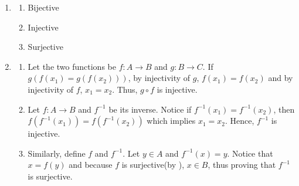 \begin{Solution}
    \begin{enumerate}
      \item{
          \begin{enumerate}
            \item{Bijective}
            \item{Injective}
            \item{Surjective}
          \end{enumerate}
        } 
      \item{
          \begin{enumerate}
            \item{Let the two functions be \(f: A \to B\) and \(g: B \to C\). If \(g(f(x_1)=g(f(x_2)))\), by injectivity of \(g\), \(f(x_1)=f(x_2)\) and by injectivity of \(f\), \(x_1=x_2\). Thus, \(g \circ f\) is injective.}
            \item{Let \(f:A \to B\) and \(f^{-1}\) be its inverse. Notice if \(f^{-1}(x_1)=f^{-1}(x_2)\), then \(f(f^{-1}(x_1))=f(f^{-1}(x_2))\) which implies \(x_1=x_2\). Hence, \(f^{-1}\) is injective.}
            \item{Similarly, define \(f\) and \(f^{-1}\). Let \(y \in A\) and \(f^{-1}(x)=y\). Notice that \(x=f(y)\) and because \(f\) is surjective(by ), \(x \in B\), thus proving that \(f^{-1}\) is surjective.}
          \end{enumerate}
        }
    \end{enumerate} 
  \end{Solution}
